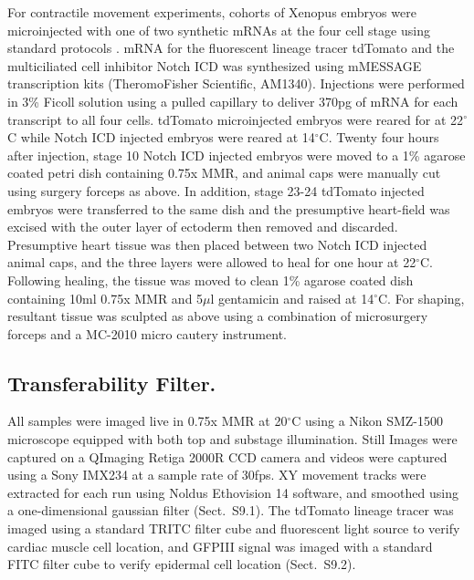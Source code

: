 For contractile movement experiments, cohorts of Xenopus embryos were microinjected with one of two synthetic mRNAs at the four cell stage using standard protocols \cite{nieuwkoop1956normal}. 
mRNA for the fluorescent lineage tracer tdTomato \cite{waldner2009red} and the multiciliated cell inhibitor Notch ICD \cite{deblandre1999two,beck1999developmental} was synthesized using mMESSAGE transcription kits (TheromoFisher Scientific, AM1340). 
Injections were performed in 3\% Ficoll solution using a pulled capillary to deliver 370pg of mRNA for each transcript to all four cells. tdTomato microinjected embryos were reared for at 22{$^{\circ}$}C while Notch ICD injected embryos were reared at 14{$^{\circ}$}C. 
Twenty four hours after injection, stage 10 Notch ICD injected embryos were moved to a 1\% agarose coated petri dish containing 0.75x MMR, and animal caps were manually cut using surgery forceps as above. 
In addition, stage 23-24 tdTomato injected embryos were transferred to the same dish and the presumptive heart-field was excised with the outer layer of ectoderm then removed and discarded. 
Presumptive heart tissue was then placed between two Notch ICD injected animal caps, and the three layers were allowed to heal for one hour at 22{$^{\circ}$}C. 
Following healing, the tissue was moved to clean 1\% agarose coated dish containing 10ml 0.75x MMR and 5{$\mu$}l gentamicin and raised at 14{$^{\circ}$}C. 
For shaping, resultant tissue was sculpted as above using a combination of microsurgery forceps and a MC-2010 micro cautery instrument.

\subsection*{Transferability Filter.}  

All samples were imaged live in 0.75x MMR at 20{$^{\circ}$}C using a Nikon SMZ-1500 microscope equipped with both top and substage illumination. 
Still Images were captured on a QImaging Retiga 2000R CCD camera and videos were captured using a Sony IMX234 at a sample rate of 30fps. 
XY movement tracks were extracted for each run using Noldus Ethovision 14 software, and smoothed using a one-dimensional gaussian filter (Sect.~S9.1). 
The tdTomato lineage tracer was imaged using a standard TRITC filter cube and fluorescent light source to verify cardiac muscle cell location, and GFPIII signal was imaged with a standard FITC filter cube to verify epidermal cell location (Sect.~S9.2). 




